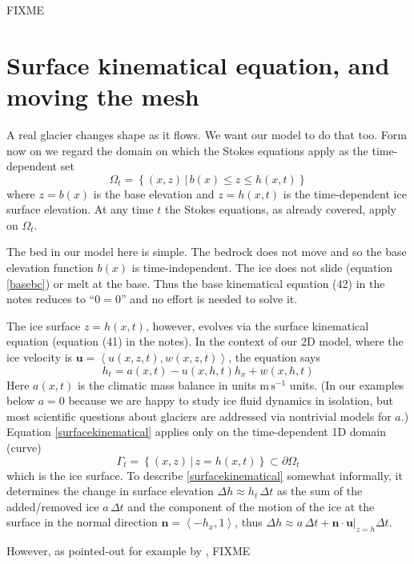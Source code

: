 \documentclass[letterpaper,final,12pt,reqno]{amsart}
\newcommand{\bn}{\mathbf{n}}
\newcommand{\bu}{\mathbf{u}}
\begin{document}
FIXME

\section{Surface kinematical equation, and moving the mesh}

A real glacier changes shape as it flows.  We want our model to do that too.  Form now on we regard the domain on which the Stokes equations apply as the time-dependent set
\begin{equation}
\Omega_t = \left\{(x,z)\,\big|\, b(x) \le z \le h(x,t)\right\}  \label{Omegat}
\end{equation}
where $z=b(x)$ is the base elevation and $z=h(x,t)$ is the time-dependent ice surface elevation.  At any time $t$ the Stokes equations, as already covered, apply on $\Omega_t$.

The bed in our model here is simple.  The bedrock does not move and so the base elevation function $b(x)$ is time-independent.  The ice does not slide (equation \eqref{basebc}) or melt at the base.  Thus the base kinematical equation (42) in the notes reduces to ``$0=0$'' and no effort is needed to solve it.

The ice surface $z=h(x,t)$, however, evolves via the surface kinematical equation (equation (41) in the notes).  In the context of our 2D model, where the ice velocity is $\bu=\left<u(x,z,t),w(x,z,t)\right>$, the equation says
\begin{equation}
h_t = a(x,t) - u(x,h,t) h_x + w(x,h,t) \label{surfacekinematical}
\end{equation}
Here $a(x,t)$ is the climatic mass balance in units $\text{m}\,\text{s}^{-1}$ units.  (In our examples below $a=0$ because we are happy to study ice fluid dynamics in isolation, but most scientific questions about glaciers are addressed via nontrivial models for $a$.)  Equation \eqref{surfacekinematical} applies only on the time-dependent 1D domain (curve)
    $$\Gamma_t = \left\{(x,z) \,\big|\, z = h(x,t)\right\} \subset \partial \Omega_t$$
which is the ice surface.  To describe \eqref{surfacekinematical} somewhat informally, it determines the change in surface elevation $\Delta h \approx h_t\,\Delta t$ as the sum of the added/removed ice $a\,\Delta t$ and the component of the motion of the ice at the surface in the normal direction $\bn = \left<-h_x,1\right>$, thus $\Delta h \approx a \,\Delta t + \bn\cdot \bu\big|_{z=h} \Delta t$.

However, as pointed-out for example by \cite[pp.~65--66]{GreveBlatter2009}, FIXME
\end{document}
